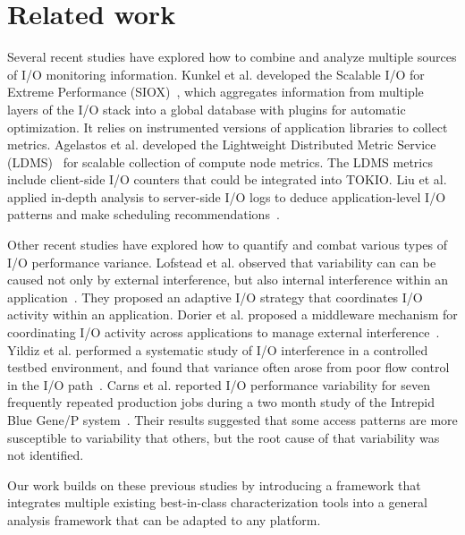 \section{Related work} \label{sec:related}

Several recent studies have explored how to combine
and analyze multiple sources of I/O monitoring information.
Kunkel et al. developed the Scalable I/O for Extreme Performance
(SIOX)~\cite{Kunkel:2014:SAC:2769884.2769901}, which aggregates
information from multiple layers of the I/O stack into a global database
with plugins for automatic optimization.  It relies on instrumented
versions of application libraries to collect metrics.  Agelastos et al.
developed the Lightweight Distributed Metric Service (LDMS)~\cite{7013000}
for scalable collection of compute node metrics. The LDMS metrics include
client-side I/O counters that could be integrated into TOKIO.  Liu et al. applied in-depth
analysis to server-side I/O logs to deduce application-level I/O patterns
and make scheduling recommendations~\cite{Liu2016}.

Other recent studies have explored how to quantify and combat various
types of I/O performance variance.  Lofstead et al. observed that
variability can can be caused not only by external interference, but also
internal interference within an application~\cite{Lofstead2010}.
They proposed an adaptive I/O strategy that coordinates I/O activity
within an application.  Dorier et al. proposed a middleware mechanism
for coordinating I/O activity across applications to manage external
interference~\cite{dorier2014calciom}.  Yildiz et al. performed a
systematic study of I/O interference in a controlled testbed environment,
and found that variance often arose from poor flow control in the I/O
path~\cite{Yildiz2016}.  Carns et al. reported I/O performance variability
for seven frequently repeated production jobs during a two month study
of the Intrepid Blue Gene/P system~\cite{carns2011understanding}.
Their results suggested that some access patterns are more susceptible
to variability that others, but the root cause of that variability was
not identified.

Our work builds on these previous studies by introducing a framework that
integrates multiple existing best-in-class characterization tools into a
general analysis framework that can be adapted to any platform.


